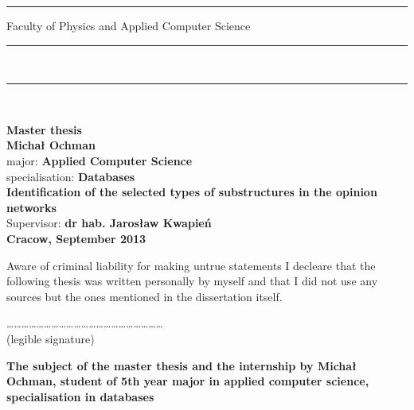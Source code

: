 \rule{26.75mm}{0pt}{
{\large \textsf{Faculty of Physics and Applied Computer Science}}\\
\rule{\textwidth}{3pt}\\
\rule[2ex]
{\textwidth}{1pt}\\
\vspace{7ex}
\begin{center}
{\LARGE \bf \textsf{Master thesis}}\\
\vspace{13ex}
{\bf \Large \textsf{Michał Ochman}}\\
\vspace{3ex}
{\small \sf major: {\bf \textsf{Applied Computer Science}}}\\
\vspace{1.5ex}
{\small \sf specialisation: {\bf \textsf{Databases}}}\\
\vspace{10ex}
{\bf \huge \textsf{Identification of the selected types of substructures in the opinion networks}}\\
\vspace{14ex}
{\Large \sf Supervisor: {\bf \textsf{dr hab. Jarosław Kwapień}}}\\
\vspace{22ex}
{\large \bf \textsf{Cracow, September 2013}}
\end{center}

\newpage
\thispagestyle{empty}
Aware of criminal liability for making untrue statements I decleare that
the following thesis was written personally by myself and that I did not use
any sources but the ones mentioned in the dissertation itself.

\vspace{10ex}
\begin{flushright}
\ldots\ldots\ldots\ldots\ldots\ldots\ldots\ldots\ldots\ldots\ldots\ldots\ldots\ldots\ldots\ldots\ldots\ldots\ldots\ldots\ldots\\
(legible signature)
\end{flushright}


\newpage

\begin{center}
{\bf The subject of the master thesis and the internship by Michał Ochman,
student of 5th year major in applied computer science, specialisation in databases}\\
\end{center}

}
